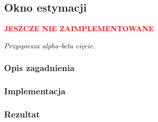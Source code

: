 \subsection{Okno estymacji}
\label{subsec:okno-estymacji}
\begin{center}
    \textcolor{red}{\textbf{JESZCZE NIE ZAIMPLEMENTOWANE}}
\end{center}
\textit{Przyspiesza alpha-beta cięcie.}


\subsubsection{Opis zagadnienia}
\subsubsection{Implementacja}
\subsubsection{Rezultat}